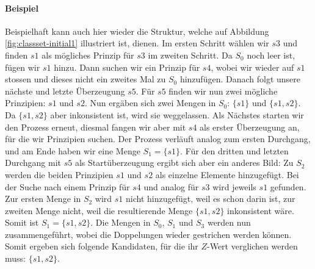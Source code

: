 \documentclass{article}
\begin{document}
\paragraph{Beispiel}
Beispielhaft kann auch hier wieder die Struktur, welche auf Abbildung \ref{fig:classset-initial1} illustriert ist, dienen. Im ersten Schritt wählen wir $s3$ und finden $s1$ als mögliches Prinzip für $s3$ im zweiten Schritt. Da $S_0$ noch leer ist, fügen wir $s1$ hinzu. Dann suchen wir ein Prinzip für $s4$, wobei wir wieder auf $s1$ stossen und dieses nicht ein zweites Mal zu $S_0$ hinzufügen. Danach folgt unsere nächste und letzte Überzeugung $s5$. Für $s5$ finden wir nun zwei mögliche Prinzipien: $s1$ und $s2$. Nun ergäben sich zwei Mengen in $S_0$: $\{s1\}$ und $\{s1, s2\}$. Da $\{s1, s2\}$ aber inkonsistent ist, wird sie weggelassen. Als Nächstes starten wir den Prozess erneut, diesmal fangen wir aber mit $s4$ als erster Überzeugung an, für die wir Prinzipien suchen. Der Prozess verläuft analog zum ersten Durchgang, und am Ende haben wir eine Menge $S_1 = \{s1\}$. Für den dritten und letzten Durchgang mit $s5$ als Startüberzeugung ergibt sich aber ein anderes Bild: Zu $S_2$ werden die beiden Prinzipien $s1$ und $s2$ als einzelne Elemente hinzugefügt. Bei der Suche nach einem Prinzip für $s4$ und analog für $s3$ wird jeweils $s1$ gefunden. Zur ersten Menge in $S_2$ wird $s1$ nicht hinzugefügt, weil es schon darin ist, zur zweiten Menge nicht, weil die resultierende Menge $\{s1,s2\}$ inkonsistent wäre. Somit ist $S_1 = \{{s1}, {s2}\}$. Die Mengen in $S_0$, $S_1$ und $S_3$ werden nun zusammengeführt, wobei die Doppelungen wieder gestrichen werden können. Somit ergeben sich folgende Kandidaten, für die ihr $Z$-Wert verglichen werden muss: $\{{s1}, {s2}\}$.

\newpage
\printbibliography
\end{document}
